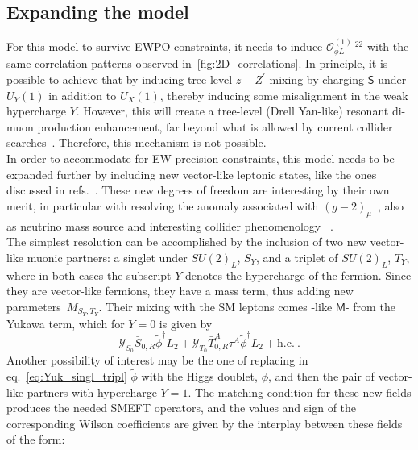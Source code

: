 \subsection{Expanding the model}
For this model to survive EWPO constraints, it needs to induce  $\mathcal O_{\phi L}^{(1)}\ ^{22}$ with the same correlation patterns observed in~\autoref{fig:2D_correlations}.  In principle, it is possible to achieve that by inducing tree-level $z-Z^\prime$ mixing by charging $\mathsf{S}$ under $U_Y(1)$ in addition to $U_X(1)$, thereby inducing some misalignment in the weak hypercharge $Y$. However, this will create a tree-level (Drell Yan-like) resonant di-muon production enhancement, far beyond what is allowed by current collider searches~\cite{ATLAS-CONF-2019-001}.  Therefore, this mechanism is not possible. \\ In order to accommodate for EW precision constraints, this model needs to be expanded further by including new vector-like leptonic states, like the ones discussed in refs.~\cite{Thomas:1998wy,delAguila:2008pw}. These new degrees of freedom are interesting by their own merit, in particular with resolving the anomaly associated with $(g-2)_{\mu}$~\cite{Kannike:2011ng,Muong-2:2021ojo}, also as neutrino mass source and interesting collider phenomenology ~\cite{Kumar:2015tna,Bhattiprolu:2019vdu}.\\ 
The simplest resolution can be accomplished by the inclusion of  two new vector-like muonic partners: a singlet under $SU(2)_{L}$, $S_{Y}$, and a triplet of $SU(2)_{L}$, $T_{Y}$, 
where in both cases the subscript $Y$ denotes the hypercharge of the fermion. Since they are vector-like fermions, they have a mass term, thus adding new parameters~$M_{S_{Y},T_{Y}}$. Their mixing with the SM leptons comes -like $\mathsf{M}$- from the Yukawa term, which for $Y=0$ is given by
\begin{equation}
	\label{eq:Yuk_singl_tripl}
	\mathcal{Y}_{S_{0}} \bar{S}_{0,R} \tilde{\phi}^{\dagger} L_{2} + \mathcal{Y}_{T_{0}} \bar{T}^{A}_{0,R} \tau^{A} \tilde{\phi}^{\dagger} L_{2} + \textrm{h.c.}  \ .
\end{equation} 
Another possibility of interest may be the one of replacing in eq.~\eqref{eq:Yuk_singl_tripl} $\tilde{\phi} $
with the Higgs doublet, $\phi$, and then the pair of vector-like partners with hypercharge $Y=1$.  The matching condition for these new fields produces the needed SMEFT operators, and the values and sign of the corresponding Wilson coefficients are given by the interplay between these fields ~\cite{delAguila:2008pw,Kannike:2011ng} of the form:
